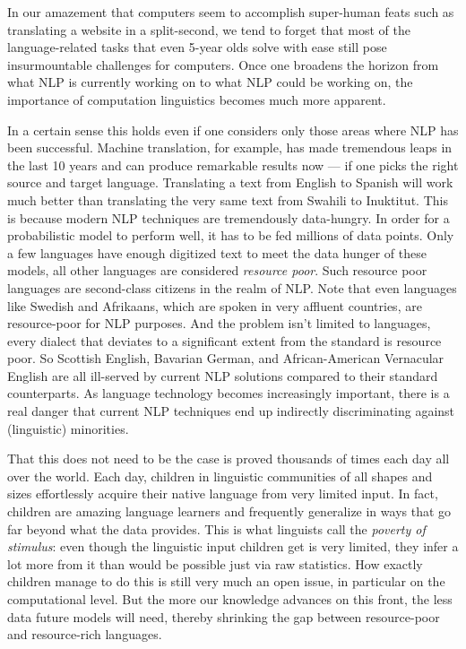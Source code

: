 %
In our amazement that computers seem to accomplish super-human feats such as translating a website in a split-second, we tend to forget that most of the language-related tasks that even 5-year olds solve with ease still pose insurmountable challenges for computers.
Once one broadens the horizon from what NLP is currently working on to what NLP could be working on, the importance of computation linguistics becomes much more apparent.

In a certain sense this holds even if one considers only those areas where NLP has been successful.
Machine translation, for example, has made tremendous leaps in the last 10 years and can produce remarkable results now --- if one picks the right source and target language.
Translating a text from English to Spanish will work much better than translating the very same text from Swahili to Inuktitut.
This is because modern NLP techniques are tremendously data-hungry.
In order for a probabilistic model to perform well, it has to be fed millions of data points.
Only a few languages have enough digitized text to meet the data hunger of these models, all other languages are considered \emph{resource poor}.
Such resource poor languages are second-class citizens in the realm of NLP\@.
Note that even languages like Swedish and Afrikaans, which are spoken in very affluent countries, are resource-poor for NLP purposes.
And the problem isn't limited to languages, every dialect that deviates to a significant extent from the standard is resource poor.
So Scottish English, Bavarian German, and African-American Vernacular English are all ill-served by current NLP solutions compared to their standard counterparts.
As language technology becomes increasingly important, there is a real danger that current NLP techniques end up indirectly discriminating against (linguistic) minorities.

That this does not need to be the case is proved thousands of times each day all over the world.
Each day, children in linguistic communities of all shapes and sizes effortlessly acquire their native language from very limited input.
In fact, children are amazing language learners and frequently generalize in ways that go far beyond what the data provides.
This is what linguists call the \emph{poverty of stimulus}: even though the linguistic input children get is very limited, they infer a lot more from it than would be possible just via raw statistics. 
How exactly children manage to do this is still very much an open issue, in particular on the computational level.
But the more our knowledge advances on this front, the less data future models will need, thereby shrinking the gap between resource-poor and resource-rich languages.

